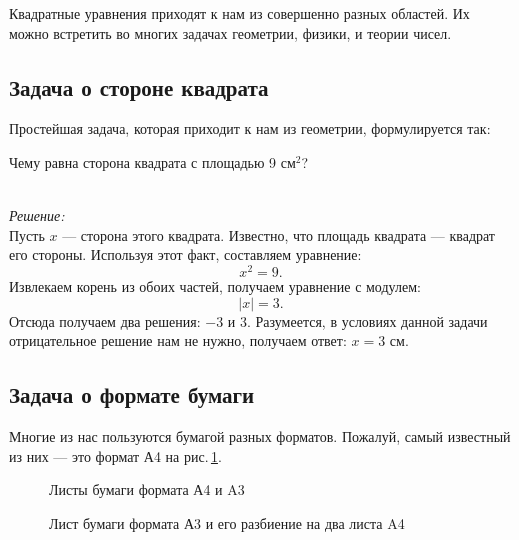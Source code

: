 \documentclass[11pt,fleqn]{book} %
\begin{document}
Квадратные уравнения приходят к нам из совершенно разных областей. Их можно встретить во многих задачах геометрии, физики, и теории чисел. 

\subsection{Задача о стороне квадрата}
Простейшая задача, которая приходит к нам из геометрии, формулируется так:

\begin{problem}
Чему равна сторона квадрата с площадью 9 $\text{см}^2$?
\end{problem}
~\\ \textit{Решение:} ~\\ Пусть $x$ --- сторона этого квадрата. Известно, что площадь квадрата --- квадрат его стороны. Используя этот факт, составляем уравнение: $$x^2 = 9.$$ Извлекаем корень из обоих частей, получаем уравнение с модулем: $$|x| = 3.$$ 
Отсюда получаем два решения: $-3$ и $3$. Разумеется, в условиях данной задачи отрицательное решение нам не нужно, получаем ответ: $x=3$ см.

\subsection{Задача о формате бумаги}

Многие из нас пользуются бумагой разных форматов. Пожалуй, самый известный из них --- это формат А4 на рис.\,\ref{fig:A4}. 

\begin{figure}[h]
\label{fig:A4}
\centering
{}
  \caption{Листы бумаги формата А4 и A3}
\end{figure}

\begin{figure}[h]
\label{fig:A4A3}
\centering
{}
  \caption{Лист бумаги формата А3 и его разбиение на два листа A4}
\end{figure}
\end{document}
